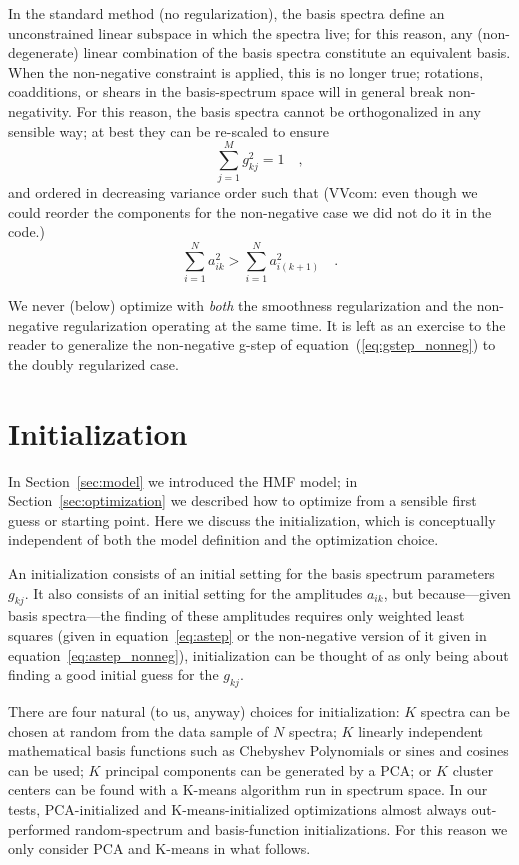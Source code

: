 \documentclass[12pt,preprint]{aastex}
\newcommand{\sectionname}{Section}
\newcommand{\equationname}{equation}
\begin{document}
In the standard method (no regularization), the basis spectra define
an unconstrained linear subspace in which the spectra live; for this
reason, any (non-degenerate) linear combination of the basis spectra
constitute an equivalent basis.  When the non-negative constraint is
applied, this is no longer true; rotations, coadditions, or shears in
the basis-spectrum space will in general break non-negativity.  For
this reason, the basis spectra cannot be orthogonalized in any
sensible way; at best they can be re-scaled to ensure
\begin{equation}\label{eq:nnnormalization}
\sum_{j=1}^{M}g_{kj}^2 = 1
\quad ,
\end{equation}
and ordered in decreasing variance order such that (VVcom: even though we could reorder the 
components for the non-negative case we did not do it in the code.)
\begin{equation}\label{eq:nnordering}
\sum_{i=1}^{N}a_{ik}^2>\sum_{i=1}^{N}a_{i(k+1)}^2
\quad .
\end{equation}

We never (below) optimize with \emph{both} the smoothness
regularization and the non-negative regularization operating at the
same time.  It is left as an exercise to the reader to generalize the
non-negative g-step of \equationname~(\ref{eq:gstep_nonneg}) to the
doubly regularized case.

\section{Initialization}\label{sec:initialization}

In \sectionname~\ref{sec:model} we introduced the HMF model; in
\sectionname~\ref{sec:optimization} we described how to optimize from
a sensible first guess or starting point.  Here we discuss the
initialization, which is conceptually independent of both the model
definition and the optimization choice.

An initialization consists of an initial setting for the basis
spectrum parameters $g_{kj}$.  It also consists of an initial setting
for the amplitudes $a_{ik}$, but because---given basis spectra---the
finding of these amplitudes requires only weighted least squares
(given in \equationname~\ref{eq:astep} or the non-negative version of
it given in \equationname~\ref{eq:astep_nonneg}), initialization can
be thought of as only being about finding a good initial guess for the
$g_{kj}$.

There are four natural (to us, anyway) choices for initialization: $K$
spectra can be chosen at random from the data sample of $N$ spectra;
$K$ linearly independent mathematical basis functions such as
Chebyshev Polynomials or sines and cosines can be used; $K$ principal
components can be generated by a PCA; or $K$ cluster centers can be
found with a K-means algorithm run in spectrum space.  In our tests,
PCA-initialized and K-means-initialized optimizations almost always
out-performed random-spectrum and basis-function initializations.  For
this reason we only consider PCA and K-means in what follows.
\end{document}
